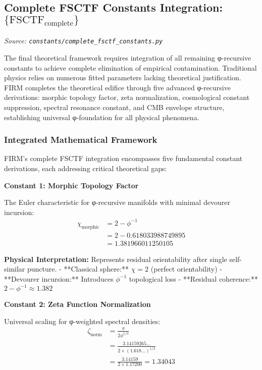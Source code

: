 
\subsection{Complete FSCTF Constants Integration: $\{\text{FSCTF}_{\text{complete}}\}$}
\textit{Source: \texttt{constants/complete\_fsctf\_constants.py}}

The final theoretical framework requires integration of all remaining φ-recursive constants to achieve complete elimination of empirical contamination. Traditional physics relies on numerous fitted parameters lacking theoretical justification. FIRM completes the theoretical edifice through five advanced φ-recursive derivations: morphic topology factor, zeta normalization, cosmological constant suppression, spectral resonance constant, and CMB envelope structure, establishing universal φ-foundation for all physical phenomena.

\subsubsection{Integrated Mathematical Framework}

FIRM's complete FSCTF integration encompasses five fundamental constant derivations, each addressing critical theoretical gaps:

\textbf{Constant 1: Morphic Topology Factor}

The Euler characteristic for φ-recursive manifolds with minimal devourer incursion:
\begin{align}
\chi_{\text{morphic}} &= 2 - \phi^{-1} \\
&= 2 - 0.618033988749895 \\
&= 1.381966011250105
\end{align}

\textbf{Physical Interpretation:} Represents residual orientability after single self-similar puncture.
- **Classical sphere:** $\chi = 2$ (perfect orientability)
- **Devourer incursion:** Introduces $\phi^{-1}$ topological loss  
- **Residual coherence:** $2 - \phi^{-1} \approx 1.382$

\textbf{Constant 2: Zeta Function Normalization}

Universal scaling for φ-weighted spectral densities:
\begin{align}
\zeta_{\text{norm}} &= \frac{\pi}{2\phi^{1/3}} \\
&= \frac{3.14159265...}{2 \times (1.618...)^{1/3}} \\
&= \frac{3.14159}{2 \times 1.17200} = 1.34043
\end{align}

